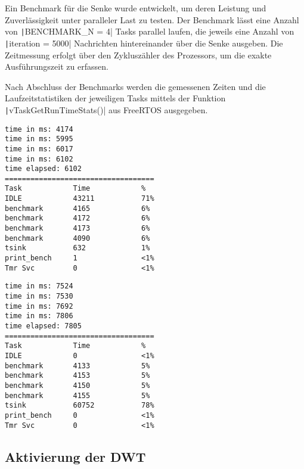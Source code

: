 Ein Benchmark für die Senke wurde entwickelt, um deren Leistung und
Zuverlässigkeit unter paralleler Last zu testen. Der Benchmark lässt eine Anzahl
von \texttt|BENCHMARK_N = 4| Tasks parallel laufen, die jeweils eine
Anzahl von \texttt|iteration = 5000| Nachrichten hintereinander über
die Senke ausgeben. Die Zeitmessung erfolgt über den Zykluszähler des
Prozessors, um die exakte Ausführungszeit zu erfassen.

Nach Abschluss der Benchmarks werden die gemessenen Zeiten und die
Laufzeitstatistiken der jeweiligen Tasks mittels
der Funktion \texttt|vTaskGetRunTimeStats()| aus FreeRTOS ausgegeben.

\begin{minipage}[t]{0.5\textwidth}
    \begin{code}
        \begin{verbatim}
time in ms: 4174
time in ms: 5995
time in ms: 6017
time in ms: 6102
time elapsed: 6102
===================================
Task            Time            %
IDLE            43211           71%
benchmark       4165            6%
benchmark       4172            6%
benchmark       4173            6%
benchmark       4090            6%
tsink           632             1%
print_bench     1               <1%
Tmr Svc         0               <1%
    \end{verbatim}
    \end{code}
\end{minipage}
\hfill
\begin{minipage}[t]{0.5\textwidth}
    \begin{code}
        \begin{verbatim}
time in ms: 7524
time in ms: 7530
time in ms: 7692
time in ms: 7806
time elapsed: 7805
===================================
Task            Time            %
IDLE            0               <1%
benchmark       4133            5%
benchmark       4153            5%
benchmark       4150            5%
benchmark       4155            5%
tsink           60752           78%
print_bench     0               <1%
Tmr Svc         0               <1%
    \end{verbatim}
    \end{code}
\end{minipage}

\subsection{Aktivierung der DWT}

